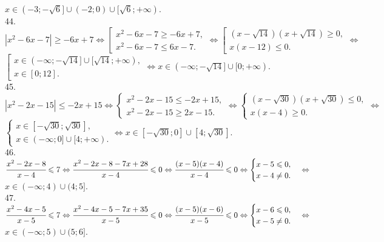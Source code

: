 \begin{figure}[ht!]
\end{figure}
$x\in(-3;-\sqrt{6}]\cup(-2;0)\cup[\sqrt{6};+\infty).$\\
44. $|x^2-6x-7|\geqslant-6x+7\Leftrightarrow \left[\begin{array}{l}x^2-6x-7\geqslant -6x+7,\\ x^2-6x-7\leqslant 6x-7.\end{array}\right.
\Leftrightarrow \left[\begin{array}{l}(x-\sqrt{14})(x+\sqrt{14})\geqslant 0,\\ x(x-12)\leqslant 0.\end{array}\right.
\Leftrightarrow$\\$ \left[\begin{array}{l}x\in(-\infty;-\sqrt{14}]\cup[\sqrt{14};+\infty),\\ x\in[0;12].\end{array}\right.\Leftrightarrow
x\in(-\infty;-\sqrt{14}]\cup[0;+\infty).$\\
45. $|x^2-2x-15|\leqslant-2x+15\Leftrightarrow \begin{cases}x^2-2x-15\leqslant -2x+15,\\ x^2-2x-15\geqslant 2x-15.\end{cases}
\Leftrightarrow \begin{cases}(x-\sqrt{30})(x+\sqrt{30})\leqslant 0,\\ x(x-4)\geqslant 0.\end{cases}
\Leftrightarrow$\\$ \begin{cases} x\in[-\sqrt{30};\sqrt{30}],\\ x\in(-\infty;0]\cup[4;+\infty).\end{cases}\Leftrightarrow
x\in[-\sqrt{30};0]\cup[4;\sqrt{30}].$\\
46. $\cfrac{x^2-2x-8}{x-4}\leqslant 7\Leftrightarrow \cfrac{x^2-2x-8-7x+28}{x-4}\leqslant0 \Leftrightarrow \cfrac{(x-5)(x-4)}{x-4}\leqslant0
\Leftrightarrow \begin{cases}x-5\leqslant 0,\\ x-4\neq0.\end{cases}\Leftrightarrow$\\$ x\in (-\infty;4)\cup(4;5].$\\
47. $\cfrac{x^2-4x-5}{x-5}\leqslant 7\Leftrightarrow \cfrac{x^2-4x-5-7x+35}{x-5}\leqslant0 \Leftrightarrow \cfrac{(x-5)(x-6)}{x-5}\leqslant0
\Leftrightarrow \begin{cases}x-6\leqslant 0,\\ x-5\neq0.\end{cases}\Leftrightarrow$\\$ x\in (-\infty;5)\cup(5;6].$\\
